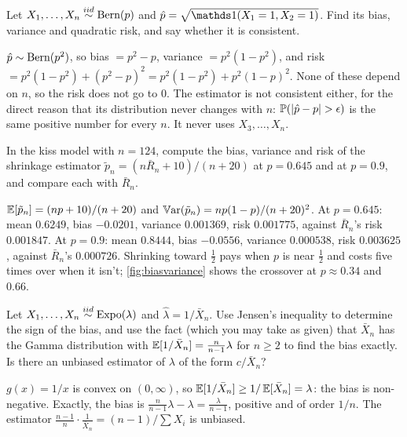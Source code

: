 \begin{exercise}
Let $X_1, \ldots, X_n \stackrel{iid}{\sim} \text{Bern}(p)$ and $\hat{p} = \sqrt{\ind(X_1 = 1, X_2 = 1)}$. Find its bias, variance and quadratic risk, and say whether it is consistent.
\end{exercise}
\begin{solution}
$\hat{p} \sim \text{Bern}(p^2)$, so bias $= p^2 - p$, variance $= p^2(1-p^2)$, and risk $= p^2(1-p^2) + (p^2 - p)^2 = p^2(1 - p^2) + p^2(1-p)^2$. None of these depend on $n$, so the risk does not go to $0$. The estimator is not consistent either, for the direct reason that its distribution never changes with $n$: $\mathbb{P}(\lvert\hat{p} - p\rvert > \epsilon)$ is the same positive number for every $n$. It never uses $X_3, \ldots, X_n$.
\end{solution}

\begin{exercise}
In the kiss model with $n = 124$, compute the bias, variance and risk of the shrinkage estimator $\tilde{p}_n = (n \bar{R}_n + 10)/(n + 20)$ at $p = 0.645$ and at $p = 0.9$, and compare each with $\bar{R}_n$.
\end{exercise}
\begin{solution}
$\operatorname*{\mathbb{E}}[\tilde{p}_n] = (np + 10)/(n + 20)$ and $\operatorname*{\mathbb{V}\text{ar}}(\tilde{p}_n) = n p(1-p)/(n+20)^2$. At $p = 0.645$: mean $0.6249$, bias $-0.0201$, variance $0.001369$, risk $0.001775$, against $\bar{R}_n$'s risk $0.001847$. At $p = 0.9$: mean $0.8444$, bias $-0.0556$, variance $0.000538$, risk $0.003625$, against $\bar{R}_n$'s $0.000726$. Shrinking toward $\frac12$ pays when $p$ is near $\frac12$ and costs five times over when it isn't; \cref{fig:biasvariance} shows the crossover at $p \approx 0.34$ and $0.66$.
\end{solution}

\begin{exercise}
Let $X_1, \ldots, X_n \stackrel{iid}{\sim} \text{Expo}(\lambda)$ and $\hat{\lambda} = 1/\bar{X}_n$. Use Jensen's inequality to determine the sign of the bias, and use the fact (which you may take as given) that $\bar{X}_n$ has the Gamma distribution with $\operatorname*{\mathbb{E}}[1/\bar{X}_n] = \frac{n}{n-1} \lambda$ for $n \geq 2$ to find the bias exactly. Is there an unbiased estimator of $\lambda$ of the form $c/\bar{X}_n$?
\end{exercise}
\begin{solution}
$g(x) = 1/x$ is convex on $(0,\infty)$, so $\operatorname*{\mathbb{E}}[1/\bar{X}_n] \geq 1/\operatorname*{\mathbb{E}}[\bar{X}_n] = \lambda$: the bias is non-negative. Exactly, the bias is $\frac{n}{n-1}\lambda - \lambda = \frac{\lambda}{n-1}$, positive and of order $1/n$. The estimator $\frac{n-1}{n} \cdot \frac{1}{\bar{X}_n} = (n-1)/\sum X_i$ is unbiased.
\end{solution}

